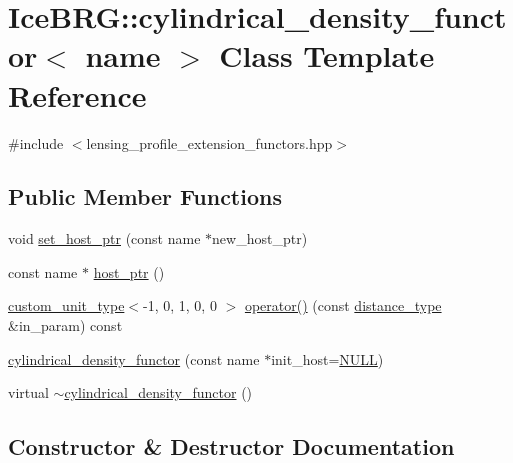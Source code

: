 \hypertarget{classIceBRG_1_1cylindrical__density__functor}{}\section{Ice\+B\+R\+G\+:\+:cylindrical\+\_\+density\+\_\+functor$<$ name $>$ Class Template Reference}
\label{classIceBRG_1_1cylindrical__density__functor}


{\ttfamily \#include $<$lensing\+\_\+profile\+\_\+extension\+\_\+functors.\+hpp$>$}

\subsection*{Public Member Functions}
\begin{DoxyCompactItemize}
\item 
void \hyperlink{classIceBRG_1_1cylindrical__density__functor_a599f26f17d250c82adfb88e1fbdfabff}{set\+\_\+host\+\_\+ptr} (const name $\ast$new\+\_\+host\+\_\+ptr)
\item 
const name $\ast$ \hyperlink{classIceBRG_1_1cylindrical__density__functor_a40f0ba02764d0749cc7dcdd3d2673b0a}{host\+\_\+ptr} ()
\item 
\hyperlink{namespaceIceBRG_a896bc1bf7e8db5ca045b9cf35912ca5e}{custom\+\_\+unit\+\_\+type}$<$-\/1, 0, 1, 0, 0 $>$ \hyperlink{classIceBRG_1_1cylindrical__density__functor_ab86926c7bd917d867d105fe5d8d79506}{operator()} (const \hyperlink{namespaceIceBRG_a45499647eb87e24c10ab32c628711cec}{distance\+\_\+type} \&in\+\_\+param) const 
\item 
\hyperlink{classIceBRG_1_1cylindrical__density__functor_a9f32a3aa13fbadc314dbf36fa870ea65}{cylindrical\+\_\+density\+\_\+functor} (const name $\ast$init\+\_\+host=\hyperlink{lib_2IceBRG__main_2common_8h_a070d2ce7b6bb7e5c05602aa8c308d0c4}{N\+U\+L\+L})
\item 
virtual \hyperlink{classIceBRG_1_1cylindrical__density__functor_a5c0d681ec3253c39576f5645b05d8205}{$\sim$cylindrical\+\_\+density\+\_\+functor} ()
\end{DoxyCompactItemize}


\subsection{Constructor \& Destructor Documentation}
\hypertarget{classIceBRG_1_1cylindrical__density__functor_a9f32a3aa13fbadc314dbf36fa870ea65}{}
